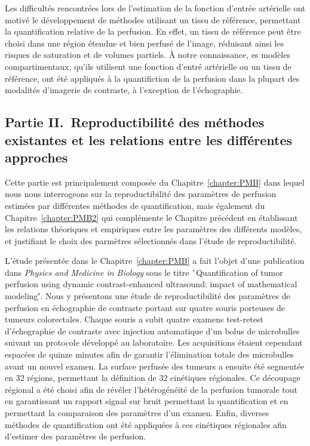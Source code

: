 \begin{otherlanguage}{francais}
Les difficult\'es rencontr\'ees lors de l'estimation de la fonction d'entr\'ee art\'erielle ont motiv\'e le d\'eveloppement de m\'ethodes utilisant un tissu de r\'ef\'erence, permettant la quantification relative de la perfusion.
En effet, un tissu de r\'ef\'erence peut \^etre choisi dans une r\'egion \'etendue et bien perfus\'e de l'image, r\'eduisant ainsi les risques de saturation et de volumes partiels.
\`A notre connaissance, es mod\`eles compartimentaux, qu'ils utilisent une fonction d'entr\'e art\'erielle ou un tissu de r\'ef\'erence, ont \'et\'e appliqu\'es \`a la quantifiction de la perfusion dans la plupart des modalit\'es d'imagerie de contraste, \`a l'exception de l'\'echographie.

\subsection*{Partie II.~Reproductibilit\'e des m\'ethodes existantes et les relations entre les diff\'erentes approches}
Cette partie est principalement compos\'ee du Chapitre~\ref{chapter:PMB} dans lequel nous nous interrogeons sur la reproductibilit\'e des param\`etres de perfusion estim\'ees par diff\'erentes m\'ethodes de quantification, mais \'egalement du Chapitre~\ref{chapter:PMB2} qui compl\'emente le Chapitre pr\'ec\'edent en \'etablissant les relations th\'eoriques et empiriques entre les param\`etres des diff\'erents mod\`eles, et justifiant le choix des parm\`etres s\'electionn\'es dans l'\'etude de reproductibilit\'e.

L'\'etude pr\'esent\'ee dans le Chapitre~\ref{chapter:PMB} a fait l'objet d'une publication dans {\em Physics and Medicine in Biology} sous le titre \``Quantification of tumor perfusion using dynamic contrast-enhanced ultrasound: impact of mathematical modeling\''.
Nous y pr\'esentons une \'etude de reproductibilit\'e des param\`etres de perfusion en \'echographie de contraste portant sur quatre souris porteuses de tumeurs colorectales.
Chaque souris a subit quatre examens test-retest d'\'echographie de contraste avec injection automatique d'un bolus de microbulles suivant un protocole d\'evelopp\'e au laboratoire.
Les acquisitions \'etaient cependant espac\'ees de quinze minutes afin de garantir l'\'elimination totale des microbulles avant un nouvel examen.
La surface perfus\'ee des tumeurs a ensuite \'et\'e segment\'ee en 32 r\'egions, permettant la d\'efinition de 32 cin\'etiques r\'egionales.
Ce d\'ecoupage r\'egional a \'et\'e choisi afin de r\'ev\'eler l'h\'et\'erog\'en\'eit\'e de la perfusion tumorale tout en garantissant un rapport signal sur bruit permettant la quantification et en permettant la comparaison des param\`etres d'un examen.
Enfin, diverses m\'ethodes de quantification ont \'et\'e appliqu\'ees \`a ces cin\'etiques r\'egionales afin d'estimer des param\`etres de perfusion.


\end{otherlanguage}
